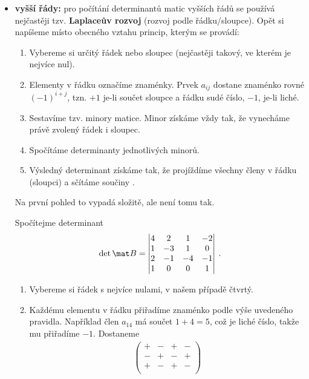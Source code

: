 \begin{itemize}
    \item \textbf{vyšší řády:} pro počítání determinantů matic vyšších řádů se používá nejčastěji tzv. \textbf{Laplaceův rozvoj} (rozvoj podle řádku/sloupce). Opět si napíšeme místo obecného vztahu princip, kterým se provádí:
    \begin{enumerate}
        \item Vybereme si určitý řádek nebo sloupec (nejčastěji takový, ve kterém je nejvíce nul).
        \item Elementy v řádku označíme znaménky. Prvek $a_{ij}$ dostane znaménko rovné $(-1)^{i+j}$, tzn. $+1$ je-li součet sloupce a řádku sudé číslo, $-1$, je-li liché.
        \item Sestavíme tzv. minory matice. Minor získáme vždy tak, že vynecháme právě zvolený řádek i sloupec.
        \item Spočítáme determinanty jednotlivých minorů.
        \item Výsledný determinant získáme tak, že projíždíme všechny členy v řádku (sloupci) a sčítáme součiny .
    \end{enumerate}
    Na první pohled to vypadá složitě, ale není tomu tak.
    \begin{example}
        Spočítejme determinant
        \begin{align}
            \det \mat B = \left|\begin{matrix}
                4 & 2 & 1 & -2 \\
                1 & -3 & 1 & 0 \\
                2 & -1 & -4 & -1 \\
                1 & 0 & 0 & 1
                \end{matrix}\right| \:.
        \end{align}
        \begin{enumerate}
            \item Vybereme si řádek s nejvíce nulami, v našem případě čtvrtý.
            \item Každému elementu v řádku přiřadíme znaménko podle výše uvedeného pravidla. Například člen $a_{14}$ má součet $1+4=5$, což je liché číslo, takže mu přiřadíme $-1$. Dostaneme
            \begin{align}
                \begin{pmatrix}
                    + & - & + & - \\
                    - & + & - & + \\
                    + & - & + & - \\

\end{pmatrix}
\end{align}
\end{enumerate}
\end{example}
\end{itemize}

